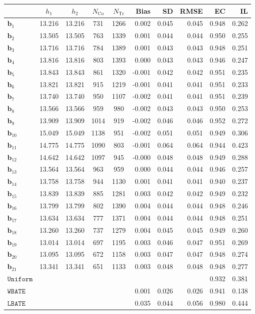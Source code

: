 \documentclass[10pt]{article}
\newcommand{\bb}{\mathbf{b}}
\begin{document}
\begin{table}[p]
    \centering
\begin{tabular}{lccccrrrrr}
\toprule\toprule
 & $h_1$ & $h_2$ & $N_{\mathrm{Co}}$ & $N_{\mathrm{Tr}}$ & Bias & SD & RMSE & EC & IL \\
\midrule
$\bb_{1}$ & 13.216 & 13.216 & 731 & 1266 & 0.002 & 0.045 & 0.045 & 0.948 & 0.262 \\
$\bb_{2}$ & 13.505 & 13.505 & 763 & 1339 & 0.001 & 0.044 & 0.044 & 0.950 & 0.255 \\
$\bb_{3}$ & 13.716 & 13.716 & 784 & 1389 & 0.001 & 0.043 & 0.043 & 0.948 & 0.251 \\
$\bb_{4}$ & 13.816 & 13.816 & 803 & 1393 & 0.000 & 0.043 & 0.043 & 0.946 & 0.247 \\
$\bb_{5}$ & 13.843 & 13.843 & 861 & 1320 & -0.001 & 0.042 & 0.042 & 0.951 & 0.235 \\
$\bb_{6}$ & 13.821 & 13.821 & 915 & 1219 & -0.001 & 0.041 & 0.041 & 0.951 & 0.233 \\
$\bb_{7}$ & 13.740 & 13.740 & 950 & 1107 & -0.002 & 0.041 & 0.041 & 0.951 & 0.239 \\
$\bb_{8}$ & 13.566 & 13.566 & 959 & 980 & -0.002 & 0.043 & 0.043 & 0.950 & 0.253 \\
$\bb_{9}$ & 13.909 & 13.909 & 1014 & 919 & -0.002 & 0.046 & 0.046 & 0.952 & 0.272 \\
$\bb_{10}$ & 15.049 & 15.049 & 1138 & 951 & -0.002 & 0.051 & 0.051 & 0.949 & 0.306 \\
$\bb_{11}$ & 14.775 & 14.775 & 1090 & 803 & -0.001 & 0.064 & 0.064 & 0.944 & 0.423 \\
$\bb_{12}$ & 14.642 & 14.642 & 1097 & 945 & -0.000 & 0.048 & 0.048 & 0.949 & 0.288 \\
$\bb_{13}$ & 13.564 & 13.564 & 963 & 959 & 0.000 & 0.044 & 0.044 & 0.946 & 0.257 \\
$\bb_{14}$ & 13.758 & 13.758 & 944 & 1130 & 0.001 & 0.041 & 0.041 & 0.940 & 0.237 \\
$\bb_{15}$ & 13.839 & 13.839 & 885 & 1281 & 0.003 & 0.042 & 0.042 & 0.949 & 0.232 \\
$\bb_{16}$ & 13.799 & 13.799 & 802 & 1390 & 0.004 & 0.044 & 0.044 & 0.948 & 0.246 \\
$\bb_{17}$ & 13.634 & 13.634 & 777 & 1371 & 0.004 & 0.044 & 0.044 & 0.948 & 0.251 \\
$\bb_{18}$ & 13.260 & 13.260 & 737 & 1279 & 0.004 & 0.045 & 0.045 & 0.949 & 0.260 \\
$\bb_{19}$ & 13.014 & 13.014 & 697 & 1195 & 0.003 & 0.046 & 0.047 & 0.951 & 0.269 \\
$\bb_{20}$ & 13.095 & 13.095 & 672 & 1158 & 0.003 & 0.047 & 0.047 & 0.948 & 0.274 \\
$\bb_{21}$ & 13.341 & 13.341 & 651 & 1133 & 0.003 & 0.048 & 0.048 & 0.948 & 0.277 \\
\midrule
$\mathtt{Uniform}$ &  &  &  &  &  &  &  & 0.932 & 0.381 \\
\midrule
$\mathtt{WBATE}$ &  &  &  &  & 0.001 & 0.026 & 0.026 & 0.941 & 0.138 \\
\midrule
$\mathtt{LBATE}$ &  &  &  &  & 0.035 & 0.044 & 0.056 & 0.980 & 0.444 \\
\bottomrule\bottomrule
\end{tabular}


\end{table}
\end{document}
